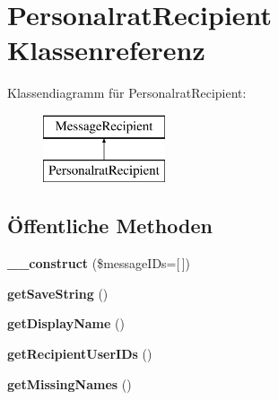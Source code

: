 \hypertarget{class_personalrat_recipient}{}\section{Personalrat\+Recipient Klassenreferenz}
\label{class_personalrat_recipient}
Klassendiagramm für Personalrat\+Recipient\+:\begin{figure}[H]
\begin{center}
\leavevmode
\includegraphics[height=2.000000cm]{class_personalrat_recipient}
\end{center}
\end{figure}
\subsection*{Öffentliche Methoden}
\begin{DoxyCompactItemize}
\item 
\mbox{\label{class_personalrat_recipient_a1e8b54433280291ef3f6e49366da222c}} 
{\bfseries \+\_\+\+\_\+construct} (\$message\+I\+Ds=\mbox{[}$\,$\mbox{]})
\item 
\mbox{\label{class_personalrat_recipient_a06f6730c5e11404f97f8cebeee5b00e6}} 
{\bfseries get\+Save\+String} ()
\item 
\mbox{\label{class_personalrat_recipient_a9d15a55b6413c4dd6becbf18c748179f}} 
{\bfseries get\+Display\+Name} ()
\item 
\mbox{\label{class_personalrat_recipient_ac315a14155282cf892207d632e198022}} 
{\bfseries get\+Recipient\+User\+I\+Ds} ()
\item 
\mbox{\label{class_personalrat_recipient_a17e5eaaf5dc21357ec7f5d2f4cd70303}} 
{\bfseries get\+Missing\+Names} ()
\end{DoxyCompactItemize}
